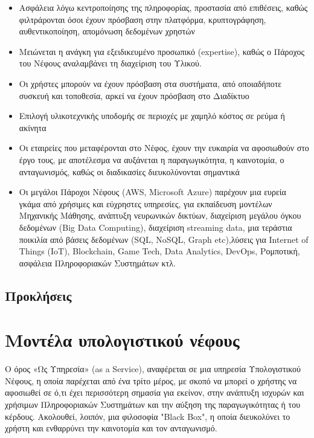 \documentclass{article}
\begin{document}
\begin{itemize}
\item Ασφάλεια λόγω κεντροποίησης της πληροφορίας, προστασία από επιθέσεις, καθώς φιλτράρονται όσοι έχουν πρόσβαση στην πλατφόρμα, κρυπτογράφηση, αυθεντικοποίηση, απομόνωση δεδομένων χρηστών
\item Μειώνεται η ανάγκη για εξειδικευμένο προσωπικό (expertise),
καθώς ο Πάροχος του Νέφους αναλαμβάνει τη διαχείριση του Υλικού.
\item Οι χρήστες μπορούν να έχουν πρόσβαση στα συστήματα, από οποιαδήποτε συσκευή και τοποθεσία, αρκεί να έχουν πρόσβαση στο Διαδίκτυο
\item Επιλογή υλικοτεχνικής υποδομής σε περιοχές με χαμηλό κόστος σε ρεύμα ή ακίνητα
\item Οι εταιρείες που μεταφέρονται στο Νέφος, έχουν την ευκαιρία να αφοσιωθούν στο έργο τους, με αποτέλεσμα να αυξάνεται η παραγωγικότητα, η καινοτομία, ο ανταγωνισμός, καθώς οι διαδικασίες διευκολύνονται σημαντικά
\item Οι μεγάλοι Πάροχοι Νέφους (AWS, Microsoft Azure) παρέχουν μια ευρεία γκάμα από χρήσιμες και εύχρηστες υπηρεσίες, για εκπαίδευση μοντέλων Μηχανικής Μάθησης, ανάπτυξη νευρωνικών δικτύων, διαχείριση μεγάλου όγκου δεδομένων (Big Data Computing), διαχείριση streaming data, μια τεράστια ποικιλία από βάσεις δεδομένων (SQL, NoSQL, Graph etc),λύσεις για Internet of Things (IoT), Blockchain, Game Tech, Data Analytics, DevOps, Ρομποτική, ασφάλεια Πληροφοριακών Συστημάτων κτλ.
\end{itemize}
















\subsection{Προκλήσεις}









\section{Μοντέλα υπολογιστικού νέφους}
Ο όρος «Ως Υπηρεσία» (as a Service), αναφέρεται σε μια υπηρεσία Υπολογιστικού Νέφους, η οποία παρέχεται από ένα τρίτο μέρος, με σκοπό να μπορεί ο χρήστης να αφοσιωθεί σε ό,τι έχει περισσότερη σημασία για εκείνον, στην ανάπτυξη ισχυρών και χρήσιμων Πληροφοριακών Συστημάτων και την αύξηση της παραγωγικότητας ή του κέρδους. Ακολουθεί, λοιπόν, μια φιλοσοφία "Black Box", η οποία διευκολύνει το χρήστη και ενθαρρύνει την καινοτομία και τον ανταγωνισμό.
\end{document}
